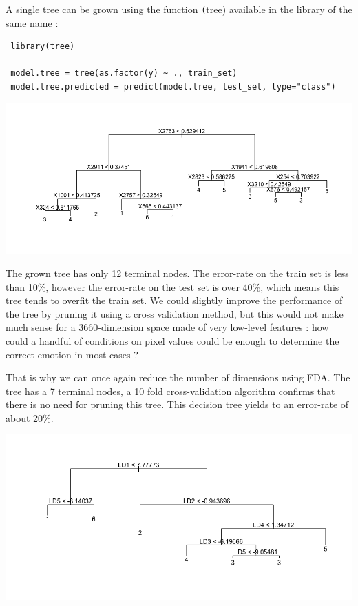 \documentclass[]{report}
\begin{document}
 A single tree can be grown using the function \texttt(tree) available in the library of the same name : 
 \begin{lstlisting}
 library(tree)
 
 model.tree = tree(as.factor(y) ~ ., train_set) 
 model.tree.predicted = predict(model.tree, test_set, type="class")
 \end{lstlisting}
 
  \begin{center}
 	\includegraphics[width=0.6\linewidth]{Figures/tree_full.png}
 	\label{fig:tree_full}
 \end{center}
 
 The grown tree has only 12 terminal nodes. The error-rate on the train set is less than 10\%, however the error-rate on the test set is over 40\%, which means this tree tends to overfit the train set. We could slightly improve the performance of the tree by pruning it using a cross validation method, but this would not make much sense for a 3660-dimension space made of very low-level features : how could a handful of conditions on pixel values could be enough to determine the correct emotion in most cases ?
 
 That is why we can once again reduce the number of dimensions using FDA. The tree has a 7 terminal nodes, a 10 fold cross-validation algorithm confirms that there is no need for pruning this tree. This decision tree yields to an error-rate of about 20\%.
 
   \begin{center}
 	\includegraphics[width=0.6\linewidth]{Figures/tree_fda.png}
 	\label{fig:tree_fda}
 \end{center}
 
\end{document}
